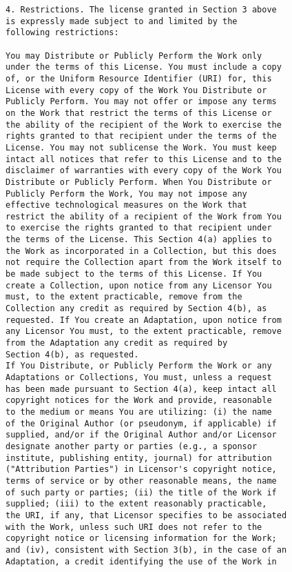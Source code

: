 \begin{verbatim}
4. Restrictions. The license granted in Section 3 above
is expressly made subject to and limited by the
following restrictions:

You may Distribute or Publicly Perform the Work only
under the terms of this License. You must include a copy
of, or the Uniform Resource Identifier (URI) for, this
License with every copy of the Work You Distribute or
Publicly Perform. You may not offer or impose any terms
on the Work that restrict the terms of this License or
the ability of the recipient of the Work to exercise the
rights granted to that recipient under the terms of the
License. You may not sublicense the Work. You must keep
intact all notices that refer to this License and to the
disclaimer of warranties with every copy of the Work You
Distribute or Publicly Perform. When You Distribute or
Publicly Perform the Work, You may not impose any
effective technological measures on the Work that
restrict the ability of a recipient of the Work from You
to exercise the rights granted to that recipient under
the terms of the License. This Section 4(a) applies to
the Work as incorporated in a Collection, but this does
not require the Collection apart from the Work itself to
be made subject to the terms of this License. If You
create a Collection, upon notice from any Licensor You
must, to the extent practicable, remove from the
Collection any credit as required by Section 4(b), as
requested. If You create an Adaptation, upon notice from
any Licensor You must, to the extent practicable, remove
from the Adaptation any credit as required by
Section 4(b), as requested.
If You Distribute, or Publicly Perform the Work or any
Adaptations or Collections, You must, unless a request
has been made pursuant to Section 4(a), keep intact all
copyright notices for the Work and provide, reasonable
to the medium or means You are utilizing: (i) the name
of the Original Author (or pseudonym, if applicable) if
supplied, and/or if the Original Author and/or Licensor
designate another party or parties (e.g., a sponsor
institute, publishing entity, journal) for attribution
("Attribution Parties") in Licensor's copyright notice,
terms of service or by other reasonable means, the name
of such party or parties; (ii) the title of the Work if
supplied; (iii) to the extent reasonably practicable,
the URI, if any, that Licensor specifies to be associated
with the Work, unless such URI does not refer to the
copyright notice or licensing information for the Work;
and (iv), consistent with Section 3(b), in the case of an
Adaptation, a credit identifying the use of the Work in

\end{verbatim}
